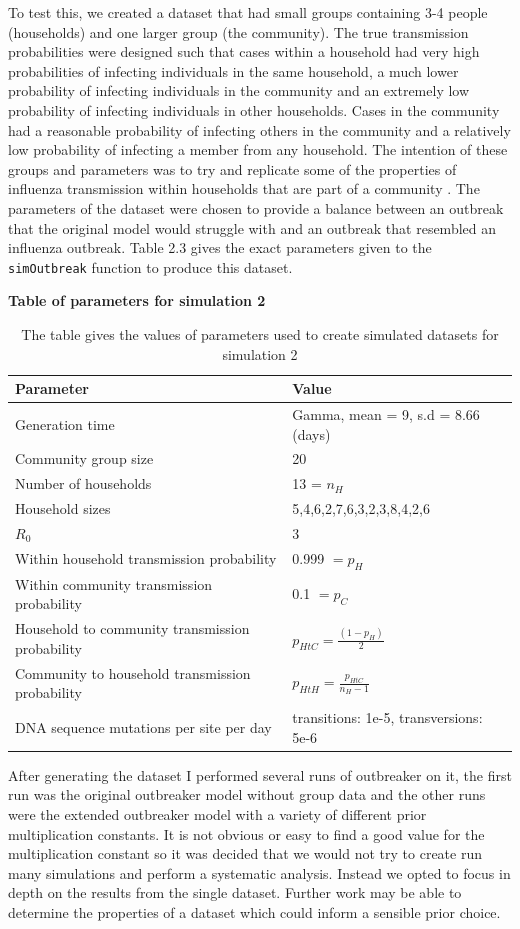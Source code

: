 \documentclass[11pt,a4paper]{report}
\begin{document}
To test this, we created a dataset that had small groups containing 3-4 people (households) and one larger group (the community). The true transmission probabilities were designed such that cases within a household had very high probabilities of infecting individuals in the same household, a much lower probability of infecting individuals in the community and an extremely low probability of infecting individuals in other households. Cases in the community had a reasonable probability of infecting others in the community and a relatively low probability of infecting a member from any household. The intention of these groups and parameters was to try and replicate some of the properties of influenza transmission within households that are part of a community \citep{Cauchemez04}. The parameters of the dataset were chosen to provide a balance between an outbreak that the original model would struggle with and an outbreak that resembled an influenza outbreak. Table 2.3 gives the exact parameters given to the {\tt simOutbreak} function to produce this dataset.
\begin{table}[h!]
\centering
{\bf Table of parameters for simulation 2}
\caption{The table gives the values of parameters used to create simulated datasets for simulation 2}
\begin{tabular}{|l|l|}
\hline
Parameter & Value \\
\hline
Generation time & Gamma, mean = 9, s.d = 8.66 (days) \\
\hline
Community group size & 20 \\
\hline
Number of households & 13 = $n_{H}$ \\
\hline
Household sizes & 5,4,6,2,7,6,3,2,3,8,4,2,6 \\
\hline
$R_0$ & 3 \\
\hline
Within household transmission probability & 0.999 $= p_{H}$ \\
\hline
Within community transmission probability & 0.1 $= p_{C}$\\
\hline
Household to community transmission probability & $p_{HtC} =\frac{(1-p_{H})}{2}$ \\
\hline
Community to household transmission probability & $p_{HtH} = \frac{p_{HtC}}{n_{H} - 1}$\\
\hline
DNA sequence mutations per site per day & transitions: 1e-5, transversions: 5e-6 \\
\hline
\end{tabular}
\end{table}
After generating the dataset I performed several runs of outbreaker on it, the first run was the original outbreaker model without group data and the other runs were the extended outbreaker model with a variety of different prior multiplication constants. It is not obvious or easy to find a good value for the multiplication constant so it was decided that we would not try to create run many simulations and perform a systematic analysis. Instead we opted to focus in depth on the results from the single dataset. Further work may be able to determine the properties of a dataset which could inform a sensible prior choice.
\end{document}
